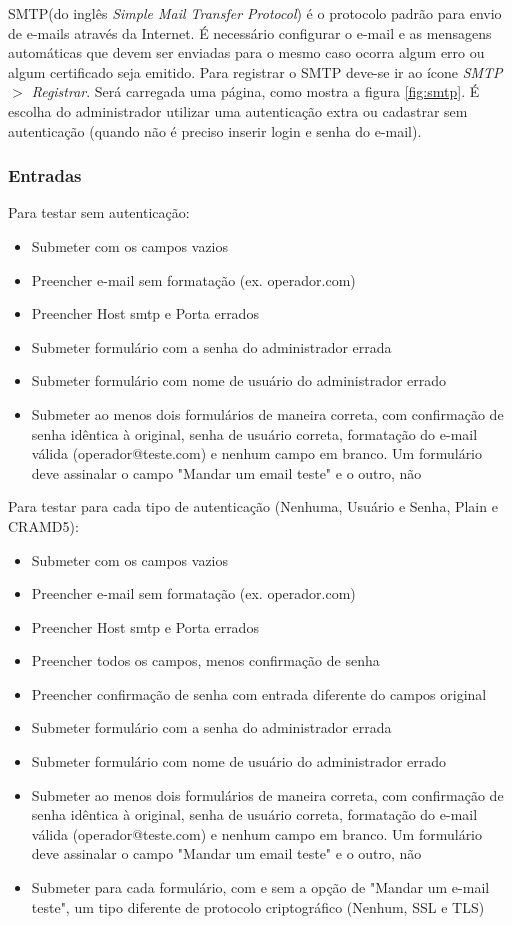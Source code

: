 SMTP(do inglês \textit{Simple Mail Transfer Protocol}) é o protocolo padrão para envio de e-mails através da Internet. É necessário configurar o e-mail e as mensagens automáticas que devem ser enviadas para o mesmo caso ocorra algum erro ou algum certificado seja emitido.
Para registrar o SMTP deve-se ir ao ícone \textit{SMTP $>$ Registrar}. Será carregada uma página, como mostra a figura \ref{fig:smtp}. É escolha do administrador utilizar uma autenticação extra ou cadastrar sem autenticação (quando não é preciso inserir login e senha do e-mail). 

\subsubsection{Entradas}
Para testar sem autenticação:

\begin{itemize}
	\item Submeter com os campos vazios 
	\item Preencher e-mail sem formatação (ex. operador.com)
	\item Preencher Host smtp e Porta errados
	\item Submeter formulário com a senha do administrador errada
	\item Submeter formulário com nome de usuário do administrador errado
	\item Submeter ao menos dois formulários de maneira correta, com confirmação de senha idêntica à original, senha de usuário correta, formatação do e-mail válida (operador@teste.com) e nenhum campo em branco. Um formulário deve assinalar o campo "Mandar um email teste" e o outro, não
\end{itemize}

Para testar para cada tipo de autenticação (Nenhuma, Usuário e Senha, Plain e CRAMD5):

\begin{itemize}
	\item Submeter com os campos vazios 
	\item Preencher e-mail sem formatação (ex. operador.com)
	\item Preencher Host smtp e Porta errados
	\item Preencher todos os campos, menos confirmação de senha
	\item Preencher confirmação de senha com entrada diferente do campos original
	\item Submeter formulário com a senha do administrador errada
	\item Submeter formulário com nome de usuário do administrador errado
	\item Submeter ao menos dois formulários de maneira correta, com confirmação de senha idêntica à original, senha de usuário correta, formatação do e-mail válida (operador@teste.com) e nenhum campo em branco. Um formulário deve assinalar o campo "Mandar um email teste" e o outro, não
	\item Submeter para cada formulário, com e sem a opção de "Mandar um e-mail teste", um tipo diferente de protocolo criptográfico (Nenhum, SSL e TLS)
\end{itemize}

